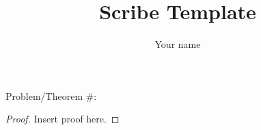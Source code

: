 \documentclass[english]{article}
\title{Scribe Template}
\author{Your name}
\theoremstyle{plain}
\begin{document}
\maketitle


Problem/Theorem \#: 

\begin{proof}
	Insert proof here.
\end{proof}
\end{document}
